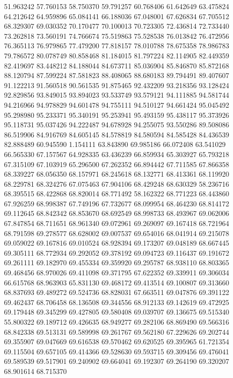 51.963242
57.760153
58.750370
59.791257
60.768406
61.642649
63.475824
64.212642
64.959896
65.084141
66.188036
67.048001
67.626834
67.705512
68.329307
69.030352
70.170477
70.100013
70.723305
72.436814
72.733440
73.262818
73.560191
74.766674
75.519863
75.528538
76.013842
76.472956
76.365113
76.979865
77.479200
77.818157
78.010788
78.675358
78.986783
79.786572
80.078749
80.858468
81.184015
81.797224
82.114905
82.449359
82.419697
83.448212
84.188044
84.673711
85.036904
85.846870
85.872168
88.120794
87.599224
87.581823
88.408065
88.680183
89.794491
89.407607
91.122213
91.560518
90.561535
91.875465
92.432209
93.218356
93.128424
92.829856
93.849015
93.894023
93.533749
93.579121
94.111885
94.581744
94.216966
94.978829
94.601478
94.755111
94.510127
94.661424
95.045492
95.298980
95.233371
95.340191
95.253941
95.493159
95.438117
95.373926
95.118731
95.037426
94.222487
94.678928
94.255075
93.550286
89.508086
86.519906
84.916769
84.605145
84.578819
84.580594
84.585428
84.436539
82.888489
60.945590
1.154111
63.843890
69.985186
66.072408
63.541029
66.565330
67.157567
64.928335
63.436239
66.859934
65.303927
65.793218
67.315109
67.103919
65.296500
67.262352
66.894442
67.711585
67.866358
68.339227
68.056350
68.157971
68.245618
68.132771
68.413361
68.119920
68.229781
68.324276
67.075463
67.904106
68.429248
68.630329
58.236716
68.395515
68.422868
68.820014
68.771492
58.162322
68.771223
68.443860
67.926259
68.998387
67.749196
67.732677
68.099954
68.464230
68.814172
69.112645
68.842342
68.853670
68.692549
68.998733
68.493967
69.062006
67.847854
68.711651
68.961340
69.072961
69.269097
69.167418
68.721964
68.791598
69.278577
68.628002
69.007537
69.654016
68.041914
69.215078
69.059022
69.167816
69.010524
68.928394
69.173207
69.048189
68.667445
69.305111
68.772934
69.292052
69.378192
69.094723
69.116437
69.191672
69.261111
69.182970
69.455334
69.359920
69.295787
68.938110
68.803365
69.468456
68.970026
69.411098
69.371795
67.622352
69.339911
69.306034
66.615768
68.963903
65.831130
69.468172
69.413514
69.100807
69.313660
68.837693
69.489272
69.524736
68.828031
67.663511
69.047876
69.391122
69.462437
68.706458
68.136508
69.344556
68.912133
69.142619
69.472925
69.179448
69.345299
69.427805
69.580408
69.039707
69.136675
69.515340
55.800322
69.189712
69.426635
68.949277
69.282106
68.869490
69.566316
68.842338
69.513131
69.589998
69.261767
69.562180
67.229626
69.202744
69.355907
69.047669
69.616538
69.570462
69.620525
69.395965
61.721354
69.115504
69.657105
69.414366
69.528630
69.593715
69.309456
69.476041
69.589539
69.517901
69.240902
69.664041
69.192307
69.264190
69.320207
68.901614
68.715370
